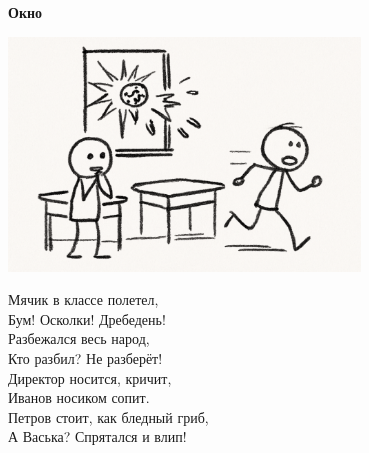 \vspace*{\fill}
\begin{center}
  {\huge\textbf{Окно}}

  \vspace{1.5em}  \includegraphics[width=0.7\textwidth]{pictures/01_okno.png}
  \vspace{4em}
  \parbox{0.6\textwidth}{
    \LARGE
    \begin{spacing}{1.2}
      Мячик в классе полетел,\\
      Бум! Осколки! Дребедень!\\
      Разбежался весь народ,\\
      Кто разбил? Не разберёт!\\
      \vspace{1em}
      Директор носится, кричит,\\
      Иванов носиком сопит.\\
      Петров стоит, как бледный гриб,\\
      А Васька? Спрятался и влип! %
    \end{spacing}
      
  }
\end{center}
\vspace*{\fill}